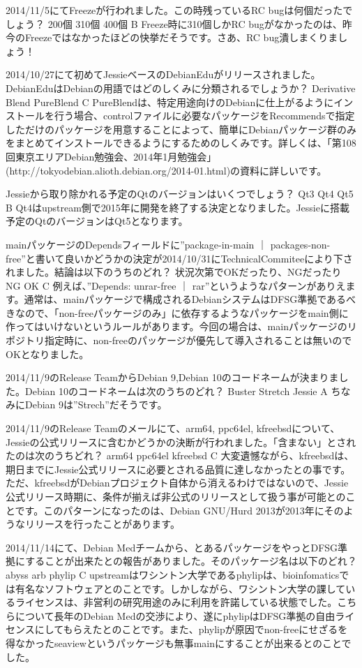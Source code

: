 \santaku
{2014/11/5にてFreezeが行われました。この時残っているRC bugは何個だったでしょう？}
{200個}
{310個}
{400個}
{B}
{Freeze時に310個しかRC bugがなかったのは、昨今のFreezeではなかったほどの快挙だそうです。さあ、RC bug潰しまくりましょう！}

\santaku
{2014/10/27にて初めてJessieベースのDebianEduがリリースされました。DebianEduはDebianの用語ではどのしくみに分類されるでしょうか？}
{Derivative}
{Blend}
{PureBlend}
{C}
{PureBlendは、特定用途向けのDebianに仕上がるようにインストールを行う場合、controlファイルに必要なパッケージをRecommendsで指定しただけのパッケージを用意することによって、簡単にDebianパッケージ群のみをまとめてインストールできるようにするためのしくみです。詳しくは、「第108回東京エリアDebian勉強会、2014年1月勉強会」(http://tokyodebian.alioth.debian.org/2014-01.html)の資料に詳しいです。}

\santaku
{Jessieから取り除かれる予定のQtのバージョンはいくつでしょう？}
{Qt3}
{Qt4}
{Qt5}
{B}
{Qt4はupstream側で2015年に開発を終了する決定となりました。Jessieに搭載予定のQtのバージョンはQt5となります。}

\santaku
{mainパッケージのDependsフィールドに''package-in-main ｜ packages-non-free''と書いて良いかどうかの決定が2014/10/31にTechnicalCommiteeにより下されました。結論は以下のうちのどれ？}
{状況次第でOKだったり、NGだったり}
{NG}
{OK}
{C}
{例えば、''Depends: unrar-free ｜ rar''というようなパターンがありえます。通常は、mainパッケージで構成されるDebianシステムはDFSG準拠であるべきなので、「non-freeパッケージのみ」に依存するようなパッケージをmain側に作ってはいけないというルールがあります。今回の場合は、mainパッケージのリポジトリ指定時に、non-freeのパッケージが優先して導入されることは無いのでOKとなりました。}

\santaku
{2014/11/9のRelease TeamからDebian 9,Debian 10のコードネームが決まりました。Debian 10のコードネームは次のうちのどれ？}
{Buster}
{Stretch}
{Jessie}
{A}
{ちなみにDebian 9は''Strech''だそうです。}

\santaku
{2014/11/9のRelease Teamのメールにて、arm64, ppc64el, kfreebsdについて、Jessieの公式リリースに含むかどうかの決断が行われました。「含まない」とされたのは次のうちどれ？}
{arm64}
{ppc64el}
{kfreebsd}
{C}
{大変遺憾ながら、kfreebsdは、期日までにJessie公式リリースに必要とされる品質に達しなかったとの事です。ただ、kfreebsdがDebianプロジェクト自体から消えるわけではないので、Jessie公式リリース時期に、条件が揃えば非公式のリリースとして扱う事が可能とのことです。このパターンになったのは、Debian GNU/Hurd 2013が2013年にそのようなリリースを行ったことがあります。}

\santaku
{2014/11/14にて、Debian Medチームから、とあるパッケージをやっとDFSG準拠にすることが出来たとの報告がありました。そのパッケージ名は以下のどれ？}
{abyss}
{arb}
{phylip}
{C}
{upstreamはワシントン大学であるphylipは、bioinfomaticsでは有名なソフトウェアとのことです。しかしながら、ワシントン大学の課しているライセンスは、非営利の研究用途のみに利用を許諾している状態でした。こちらについて長年のDebian Medの交渉により、遂にphylipはDFSG準拠の自由ライセンスにしてもらえたとのことです。また、phylipが原因でnon-freeにせざるを得なかったseaviewというパッケージも無事mainにすることが出来るとのことでした。}

